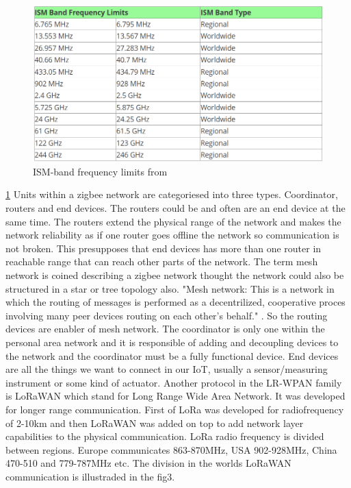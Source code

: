 \documentclass[article,a4paper]{IEEEtran}
\begin{document}
    \begin{figure}
        \includegraphics[width=\columnwidth]{ISM-band.png} 
        \caption{ISM-band frequency limits from \cite{ISM-band1}}
        \label{fig1:ISM-band frequency limits}   
    \end{figure}
    \ref{fig1:ISM-band frequency limits}
    Units within a zigbee network are categoriesed into three types. Coordinator, routers and end devices. The routers could be and often are an end device at the same time. The routers extend the physical range of the network and makes the network reliability as if one router goes offline the network so communication is not broken. This presupposes that end devices has more than one router in reachable range that can reach other parts of the network. The term mesh network is coined describing a zigbee network thought the network could also be structured in a star or tree topology also. "Mesh network: This is a network in which the routing of messages is performed as a decentrilized, cooperative proces involving many peer devices routing on each other's behalf." \cite{ZigbeeSpec}. So the routing devices are enabler of mesh network. The coordinator is only one within the personal area network and it is responsible of adding and decoupling devices to the network and the coordinator must be a fully functional device. End devices are all the things we want to connect in our IoT, usually a sensor/measuring instrument or some kind of actuator. 
    \newline\newline
    Another protocol in the LR-WPAN family is LoRaWAN which stand for Long Range Wide Area Network. It was developed for longer range communication. First of LoRa was developed for radiofrequency of 2-10km and then LoRaWAN was added on top to add network layer capabilities to the physical communication. LoRa radio frequency is divided between regions. Europe communicates 863-870MHz, USA 902-928MHz, China 470-510 and 779-787MHz etc. The division in the worlds LoRaWAN communication is illustraded in the fig3.
\end{document}
